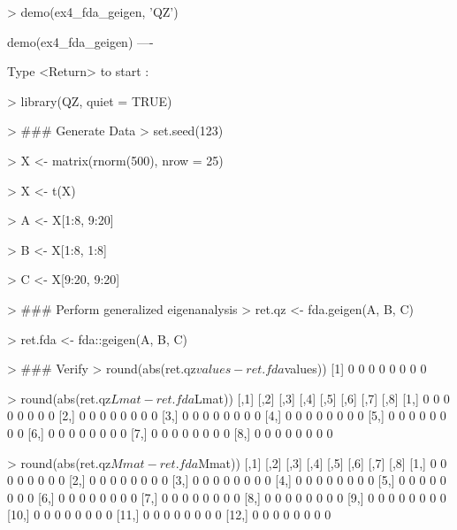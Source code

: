 \begin{Code}[title=QZ demo ex4\_fda\_geigen]
> demo(ex4_fda_geigen, 'QZ')


	demo(ex4_fda_geigen)
	---- ~~~~~~~~~~~~~~

Type  <Return>	 to start : 

> library(QZ, quiet = TRUE)

> ### Generate Data
> set.seed(123)

> X <- matrix(rnorm(500), nrow = 25)

> X <- t(X) %

> A <- X[1:8, 9:20]

> B <- X[1:8, 1:8]

> C <- X[9:20, 9:20]

> ### Perform generalized eigenanalysis 
> ret.qz <- fda.geigen(A, B, C)

> ret.fda <- fda::geigen(A, B, C)

> ### Verify
> round(abs(ret.qz$values - ret.fda$values))
[1] 0 0 0 0 0 0 0 0

> round(abs(ret.qz$Lmat - ret.fda$Lmat))
     [,1] [,2] [,3] [,4] [,5] [,6] [,7] [,8]
[1,]    0    0    0    0    0    0    0    0
[2,]    0    0    0    0    0    0    0    0
[3,]    0    0    0    0    0    0    0    0
[4,]    0    0    0    0    0    0    0    0
[5,]    0    0    0    0    0    0    0    0
[6,]    0    0    0    0    0    0    0    0
[7,]    0    0    0    0    0    0    0    0
[8,]    0    0    0    0    0    0    0    0

> round(abs(ret.qz$Mmat - ret.fda$Mmat))
      [,1] [,2] [,3] [,4] [,5] [,6] [,7] [,8]
 [1,]    0    0    0    0    0    0    0    0
 [2,]    0    0    0    0    0    0    0    0
 [3,]    0    0    0    0    0    0    0    0
 [4,]    0    0    0    0    0    0    0    0
 [5,]    0    0    0    0    0    0    0    0
 [6,]    0    0    0    0    0    0    0    0
 [7,]    0    0    0    0    0    0    0    0
 [8,]    0    0    0    0    0    0    0    0
 [9,]    0    0    0    0    0    0    0    0
[10,]    0    0    0    0    0    0    0    0
[11,]    0    0    0    0    0    0    0    0
[12,]    0    0    0    0    0    0    0    0
\end{Code}


